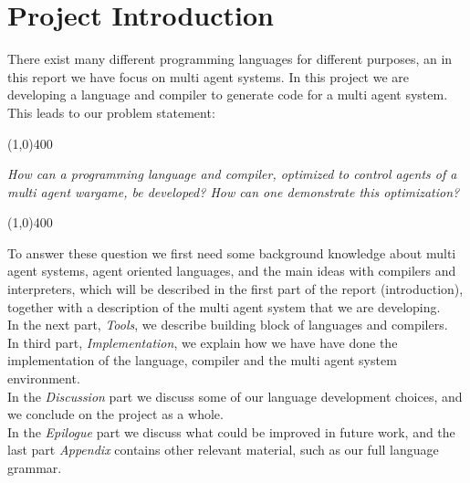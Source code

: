 \chapter*{Project Introduction}

There exist many different programming languages for different purposes, an in this report we have focus on multi agent systems. In this project we are developing a language and compiler to generate code for a multi agent system. This leads to our problem statement:
\begin{center}
\line(1,0){400}
\end{center}
	\textit{How can a programming language and compiler, optimized to control agents of a multi agent wargame, be developed? How can one demonstrate this optimization?}
\begin{center}
\line(1,0){400}
\end{center}
To answer these question we first need some background knowledge about multi agent systems, agent oriented languages, and the main ideas with compilers and interpreters, which will be described in the first part of the report (introduction), together with a description of the multi agent system that we are developing.\\ \indent
In the next part, \textit{Tools}, we describe building block of languages and compilers.\\ \indent
In third part, \textit{Implementation}, we explain how we have have done the implementation of the language, compiler and the multi agent system environment.\\ \indent
In the \textit{Discussion} part we discuss some of our language development choices, and we conclude on the project as a whole.\\ \indent
In the \textit{Epilogue} part we discuss what could be improved in future work, and the last part \textit{Appendix} contains other relevant material, such as our full language grammar.